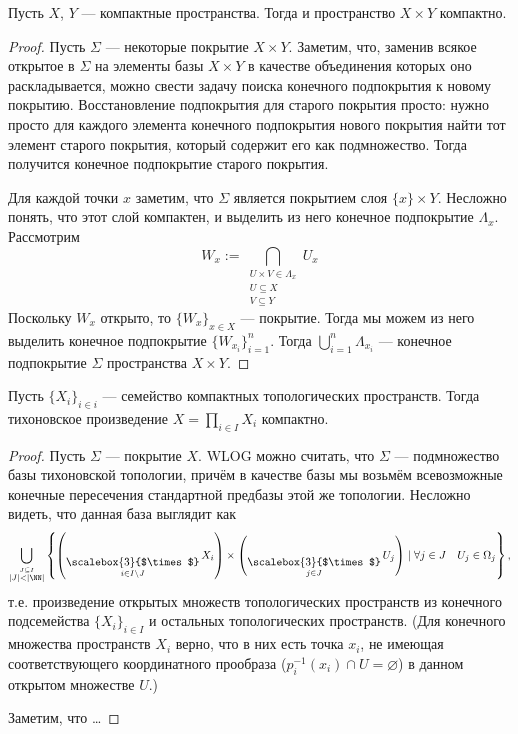 \documentclass[12pt,a4paper]{article}
\DeclareMathOperator*{\bigtimes}{\text{\raisebox{-6pt}{\scalebox{3}{$\times$}}}}
\begin{document}
    \begin{theorem}
        Пусть $X$, $Y$ --- компактные пространства. Тогда и пространство $X \times Y$ компактно.
    \end{theorem}

    \begin{proof}
        Пусть $\Sigma$ --- некоторые покрытие $X \times Y$. Заметим, что, заменив всякое открытое в $\Sigma$ на элементы базы $X \times Y$ в качестве объединения которых оно раскладывается, можно свести задачу поиска конечного подпокрытия к новому покрытию. Восстановление подпокрытия для старого покрытия просто: нужно просто для каждого элемента конечного подпокрытия нового покрытия найти тот элемент старого покрытия, который содержит его как подмножество. Тогда получится конечное подпокрытие старого покрытия.

        Для каждой точки $x$ заметим, что $\Sigma$ является покрытием слоя $\{x\} \times Y$. Несложно понять, что этот слой компактен, и выделить из него конечное подпокрытие $\Lambda_x$. Рассмотрим
        \[W_x := \bigcap_{\substack{U \times V \in \Lambda_x\\U \subseteq X\\V \subseteq Y}} U_x\]
        Поскольку $W_x$ открыто, то $\{W_x\}_{x \in X}$ --- покрытие. Тогда мы можем из него выделить конечное подпокрытие $\{W_{x_i}\}_{i = 1}^n$. Тогда $\bigcup_{i=1}^n \Lambda_{x_i}$ --- конечное подпокрытие $\Sigma$ пространства $X \times Y$.
    \end{proof}

    \begin{theorem}[Тихонова]
        Пусть $\{X_i\}_{i \in i}$ --- семейство компактных топологических пространств. Тогда тихоновское произведение $X = \prod_{i \in I} X_i$ компактно.
    \end{theorem}

    \begin{proof}
        Пусть $\Sigma$ --- покрытие $X$. WLOG можно считать, что $\Sigma$ --- подмножество базы тихоновской топологии, причём в качестве базы мы возьмём всевозможные конечные пересечения стандартной предбазы этой же топологии. Несложно видеть, что данная база выглядит как
        \[\bigcup_{\stackrel{J \subseteq I}{|J| < |\NN|}} \left\{\left(\bigtimes_{i \in I \setminus J} X_i\right) \times \left(\bigtimes_{j \in J} U_j\right) \mid \forall j \in J\quad U_j \in \Omega_j\right\},\]
        т.е. произведение открытых множеств топологических пространств из конечного подсемейства $\{X_i\}_{i \in I}$ и остальных топологических пространств. (Для конечного множества пространств $X_i$ верно, что в них есть точка $x_i$, не имеющая соответствующего координатного прообраза ($p_i^{-1}(x_i) \cap U = \varnothing$) в данном открытом множестве $U$.)

        Заметим, что \dots
    \end{proof}
\end{document}
